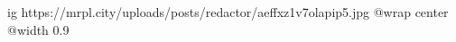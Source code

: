  
 
 
 
 

\ifcmt
  ig https://mrpl.city/uploads/posts/redactor/aeffxz1v7olapip5.jpg
  @wrap center
  @width 0.9
\fi
